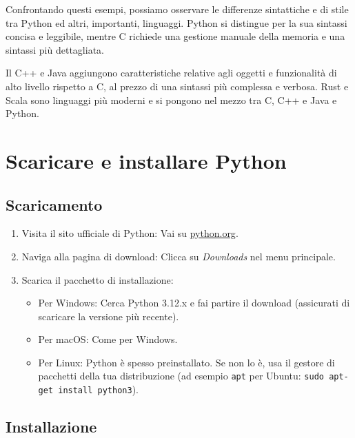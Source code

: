 \documentclass[
  letterpaper,
  DIV=11,
  numbers=noendperiod]{scrreprt}
\providecommand{\tightlist}{%
  \setlength{\itemsep}{0pt}\setlength{\parskip}{0pt}}\usepackage{longtable,booktabs,array}
\begin{document}
Confrontando questi esempi, possiamo osservare le differenze sintattiche
e di stile tra Python ed altri, importanti, linguaggi. Python si
distingue per la sua sintassi concisa e leggibile, mentre C richiede una
gestione manuale della memoria e una sintassi più dettagliata.

Il C++ e Java aggiungono caratteristiche relative agli oggetti e
funzionalità di alto livello rispetto a C, al prezzo di una sintassi più
complessa e verbosa. Rust e Scala sono linguaggi più moderni e si
pongono nel mezzo tra C, C++ e Java e Python.

\chapter{Scaricare e installare
Python}\label{scaricare-e-installare-python}

\section{Scaricamento}\label{scaricamento}

\begin{enumerate}
\def\labelenumi{\arabic{enumi}.}
\tightlist
\item
  Visita il sito ufficiale di Python: Vai su
  \href{https://www.python.org/}{python.org}.
\item
  Naviga alla pagina di download: Clicca su \emph{Downloads} nel menu
  principale.
\item
  Scarica il pacchetto di installazione:

  \begin{itemize}
  \tightlist
  \item
    Per Windows: Cerca Python 3.12.x e fai partire il download
    (assicurati di scaricare la versione più recente).
  \item
    Per macOS: Come per Windows.
  \item
    Per Linux: Python è spesso preinstallato. Se non lo è, usa il
    gestore di pacchetti della tua distribuzione (ad esempio
    \texttt{apt} per Ubuntu: \texttt{sudo\ apt-get\ install\ python3}).
  \end{itemize}
\end{enumerate}

\section{Installazione}\label{installazione}
\end{document}
